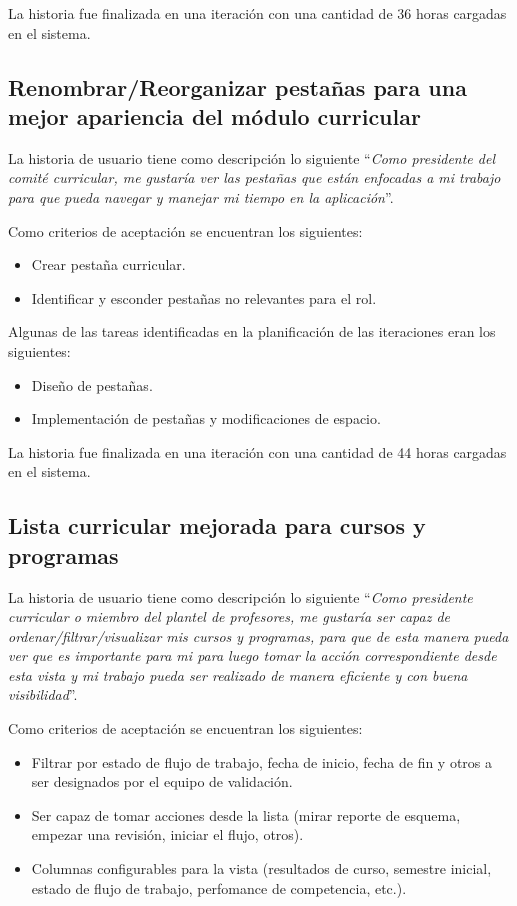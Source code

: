 La historia fue finalizada en una iteración con una cantidad de 36 horas cargadas en el sistema.

\subsection{Renombrar/Reorganizar pestañas para una mejor apariencia del módulo curricular}
La historia de usuario tiene como descripción lo siguiente \enquote{\textit{Como presidente del comité curricular, me gustaría ver las pestañas que están enfocadas a mi trabajo para que pueda navegar y manejar mi tiempo en la aplicación}}.

Como criterios de aceptación se encuentran los siguientes:
\begin{itemize}
	\item Crear pestaña curricular.
	\item Identificar y esconder pestañas no relevantes para el rol.
\end{itemize}

Algunas de las tareas identificadas en la planificación de las iteraciones eran los siguientes:
\begin{itemize}
	\item Diseño de pestañas.
	\item Implementación de pestañas y modificaciones de espacio.
\end{itemize}

La historia fue finalizada en una iteración con una cantidad de 44 horas cargadas en el sistema.


\subsection{Lista curricular mejorada para cursos y programas}
La historia de usuario tiene como descripción lo siguiente \enquote{\textit{Como presidente curricular o miembro del plantel de profesores, me gustaría ser capaz de ordenar/filtrar/visualizar mis cursos y programas, para que de esta manera pueda ver que es importante para mi para luego tomar la acción correspondiente desde esta vista y mi trabajo pueda ser realizado de manera eficiente y con buena visibilidad}}.

Como criterios de aceptación se encuentran los siguientes:
\begin{itemize}
	\item Filtrar por estado de flujo de trabajo, fecha de inicio, fecha de fin y otros a ser designados por el equipo de validación.
	\item Ser capaz de tomar acciones desde la lista (mirar reporte de esquema, empezar una revisión, iniciar el flujo, otros).
	\item Columnas configurables para la vista (resultados de curso, semestre inicial, estado de flujo de trabajo, perfomance de competencia, etc.).
\end{itemize}

